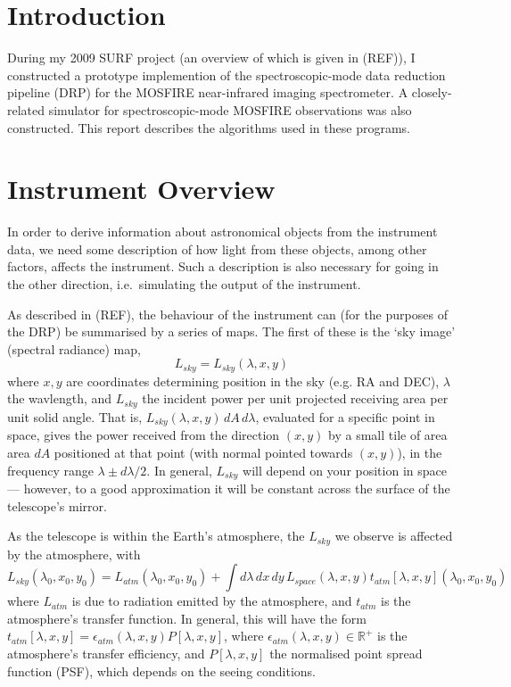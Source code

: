 \section{Introduction}

During my 2009 SURF project (an overview of which is given in (REF)),
I constructed a prototype implemention of the spectroscopic-mode
data reduction pipeline (DRP) for the MOSFIRE near-infrared imaging
spectrometer. A closely-related simulator for spectroscopic-mode MOSFIRE
observations was also constructed. This report describes the algorithms
used in these programs.

\section{Instrument Overview}

In order to derive information about astronomical objects
from the instrument data, we need some description of how light from these
objects, among other factors, affects the instrument. Such a description
is also necessary for going in the other direction, i.e.\ simulating
the output of the instrument.

As described in (REF), the behaviour of the instrument can (for the
purposes of the DRP) be summarised by a series of maps. The first of
these is the `sky image' (spectral radiance) map,
\[
L_{sky} = L_{sky} (\lambda, x, y)
\]
where $x,y$ are coordinates determining position in the sky (e.g. RA
and DEC), $\lambda$ the wavlength, and $L_{sky}$ the incident power
per unit projected receiving area per unit solid angle. That is,
$L_{sky}(\lambda, x, y)\, dA \, d\lambda$, evaluated for a specific
point in space, gives the power received from the direction $(x,y)$
by a small tile of area area $dA$ positioned at that point (with
normal pointed towards $(x,y)$), in the frequency range $\lambda \pm
d\lambda/2$. In general, $L_{sky}$ will depend on your position in
space --- however, to a good approximation it will be constant across
the surface of the telescope's mirror.

As the telescope is within the Earth's atmosphere, the $L_{sky}$
we observe is affected by the atmosphere, with
\[
L_{sky}(\lambda_0, x_0, y_0) = L_{atm}(\lambda_0, x_0, y_0) + \int d\lambda\, dx\, dy\, L_{space}(\lambda, x, y) t_{atm}[\lambda, x, y](\lambda_0, x_0, y_0)
\]
where $L_{atm}$ is due to radiation emitted by the atmosphere, and
$t_{atm}$ is the atmosphere's transfer function. In general, this will
have the form $t_{atm}[\lambda, x, y] = \epsilon_{atm}(\lambda, x,
y) P[\lambda, x, y]$, where $\epsilon_{atm} (\lambda, x, y) \in
\mathbb{R}^+$ is the atmosphere's transfer efficiency, and $P[\lambda,
x, y]$ the normalised point spread function (PSF), which depends on the
seeing conditions.


